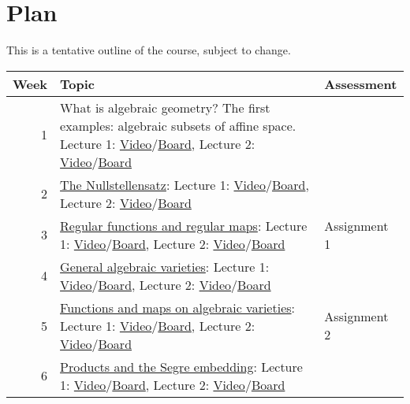 \documentclass[11pt]{article}
\begin{document}
\section{Plan}
\label{sec:org89af191}
This is a tentative outline of the course, subject to change.
\begin{center}
\begin{tabular}{rll}
\hline
Week & Topic & Assessment\\
\hline
1 & What is algebraic geometry? The first examples: algebraic subsets of affine space. Lecture 1: \href{https://web.microsoftstream.com/video/cf234444-df4b-4b65-8016-a3c1b7539891?channelId=cd4289e5-e630-458c-8ea0-2bd2632faea0}{Video}/\href{notes/2021-07-27.pdf}{Board}, Lecture 2: \href{https://web.microsoftstream.com/video/9baf2139-0fa8-4419-89f2-aabff250de07?channelId=cd4289e5-e630-458c-8ea0-2bd2632faea0}{Video}/\href{notes/2021-07-08.pdf}{Board} & \\
2 & \href{classwork02.pdf}{The Nullstellensatz}: Lecture 1: \href{https://web.microsoftstream.com/video/307216ea-46a1-40dd-9389-7bde7ea8b439?channelId=cd4289e5-e630-458c-8ea0-2bd2632faea0}{Video}/\href{notes/2021-08-02.pdf}{Board}, Lecture 2: \href{https://web.microsoftstream.com/video/a3127e92-540d-47a2-8c8f-66e8e2411163?list=studio}{Video}/\href{notes/2021-08-06.pdf}{Board} & \\
3 & \href{classwork03.pdf}{Regular functions and regular maps}: Lecture 1: \href{https://web.microsoftstream.com/video/ca9210bf-b61b-4b1f-a077-8a78c29b404e}{Video}/\href{notes/2021-08-09.pdf}{Board}, Lecture 2: \href{https://web.microsoftstream.com/video/048c9983-30be-400e-9e1b-a6019c369b83}{Video}/\href{notes/2021-08-13.pdf}{Board} & Assignment 1\\
4 & \href{classwork04.pdf}{General algebraic varieties}: Lecture 1: \href{https://web.microsoftstream.com/video/aff3b45e-5fbd-44e7-b655-1e19277560f9}{Video}/\href{notes/2021-08-16.pdf}{Board}, Lecture 2: \href{https://web.microsoftstream.com/video/34028770-b503-41f0-95f4-20377a1cc55a?list=studio}{Video}/\href{notes/2021-08-20.pdf}{Board} & \\
5 & \href{classwork05.pdf}{Functions and maps on algebraic varieties}: Lecture 1: \href{https://web.microsoftstream.com/video/248369c8-6e61-4746-a301-eafc8c7b8853}{Video}/\href{notes/2021-08-23.pdf}{Board}, Lecture 2: \href{https://web.microsoftstream.com/video/8efe045b-4d50-4e82-bb62-2042fa7678c9}{Video}/\href{notes/2021-08-27.pdf}{Board} & Assignment 2\\
6 & \href{classwork06.pdf}{Products and the Segre embedding}: Lecture 1: \href{https://web.microsoftstream.com/video/8ce2960f-c731-4001-9772-2bc88f34d8fa}{Video}/\href{notes/2021-08-30.pdf}{Board}, Lecture 2: \href{https://web.microsoftstream.com/video/f5f36337-3a49-4adf-84f6-87d0ef80229d}{Video}/\href{notes/2021-09-03.pdf}{Board} & \\

\end{tabular}
\end{center}
\end{document}
